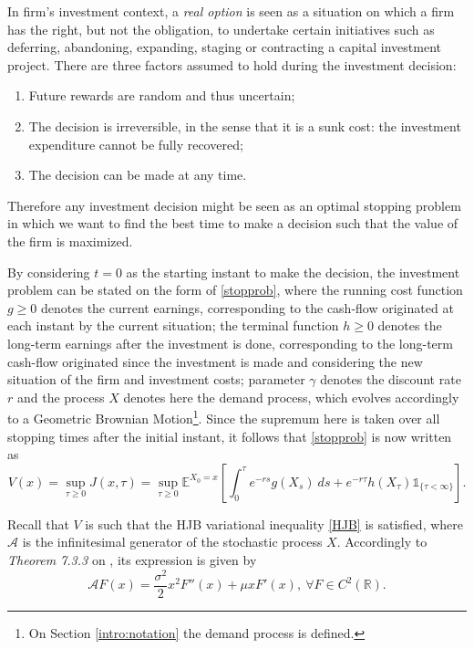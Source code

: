 In firm's investment context, a \textit{real option} is seen as a situation on which a firm has the right, but not the obligation, to undertake certain initiatives such as deferring, abandoning, expanding, staging or contracting a capital investment project. There are three factors assumed to hold during the investment decision:
\begin{enumerate}
	\item Future rewards are random and thus uncertain;
	\item The decision is irreversible, in the sense that it is a sunk cost: the investment expenditure cannot be fully recovered;
	\item The decision can be made at any time.
\end{enumerate}

Therefore any investment decision might be seen as an optimal stopping problem in which we want to find the best time to make a decision such that the value of the firm is maximized.

By considering $t=0$ as the starting instant to make the decision, the investment problem can be stated on the form of \eqref{stopprob}, where the running cost function $g\geq0$ denotes the current earnings, corresponding to the cash-flow originated at each instant by the current situation; the terminal function $h\geq0$ denotes the long-term earnings after the investment is done, corresponding to the long-term cash-flow originated since the investment is made and considering the new situation of the firm and investment costs; parameter $\gamma$ denotes the discount rate $r$ and the process $X$ denotes here the demand process, which evolves accordingly to a Geometric Brownian Motion\footnote{On Section \ref{intro:notation} the demand process is defined.}. Since the supremum here is taken over all stopping times after the initial instant, it follows that \eqref{stopprob} is now written as
\begin{equation}
V(x)=\sup_{\tau \geq 0} J(x,\tau)=\sup_{\tau \geq 0} \mathds{E}^{X_0=x}\left[ \int^\tau_0 e^{-r s} g(X_s) \ ds +e^{-r \tau}h(X_\tau) \mathds{1}_{ \{\tau< \infty \}} \right].
	\label{stopprob2}
\end{equation}

Recall that $V$ is such that the HJB variational inequality \eqref{HJB} is satisfied, where $\mathcal{A}$ is the infinitesimal generator of the stochastic process $X$. Accordingly to \textit{Theorem 7.3.3} on \cite{oksendal:book}, its expression is given by 
\begin{equation}
\mathcal{A}F(x)=
\frac{\sigma^2}{2}x^2F''(x)+\mu x F'(x), \ \forall F \in C^2(\mathds{R}).
\label{eq:Lgbm}
\end{equation}

